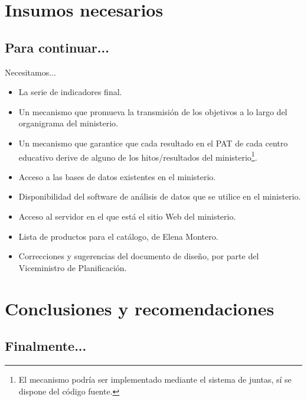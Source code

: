 \documentclass[xcolor=table, aspectratio=169]{beamer}
\begin{document}
\section{Insumos necesarios}
 
\subsection{Para continuar...}

\begin{frame}[t]{Necesitamos...}
	\begin{itemize}
		\item La serie de indicadores final.
		\item Un mecanismo que promueva la transmisi\'on de los objetivos a lo largo del organigrama del ministerio.
		\item Un mecanismo que garantice que cada resultado en el PAT de cada centro educativo derive de alguno de los hitos/resultados del ministerio\footnote{El mecanismo podr\'ia ser implementado mediante el sistema de juntas, s\'i se dispone del c\'odigo fuente.}.
		\item Acceso a las bases de datos existentes en el ministerio.
		\item Disponibilidad del software de an\'alisis de datos que se utilice en el ministerio.
		\item Acceso al servidor en el que est\'a el sitio Web del ministerio.
		\item Lista de productos para el cat\'alogo, de Elena Montero.
		\item Correcciones y sugerencias del documento de dise\~no, por parte del Viceministro de Planificaci\'on.
	\end{itemize}
\end{frame}

\section{Conclusiones y recomendaciones}

\subsection{Finalmente...}
\end{document}
